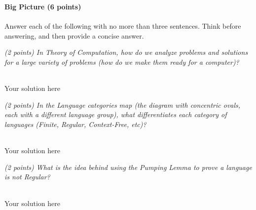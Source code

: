 \documentclass[12pt]{article}
\newenvironment{question}[2][Question]{\begin{trivlist}
\item[\hskip \labelsep {\bfseries #1}\hskip \labelsep {\bfseries #2.}]}{\end{trivlist}}
\newenvironment{solution}[1][Solution:]{\begin{trivlist}
\item[\hskip \labelsep {\bfseries #1}\hskip \labelsep {\bfseries}]\color{blue}}{\end{trivlist}}
\begin{document}
\clearpage
\begin{question}{1}\textbf{Big Picture  (6 points)}\\\\

Answer each of the following with no more than three sentences. Think before answering, and then provide a concise answer.


\begin{enumerate}[(a)]
	\item \textit{(2 points) In Theory of Computation, how do we analyze problems and solutions for a large variety of problems (how do we make them ready for a computer)?}

    \begin{solution}
  \;\\
  Your solution here
    \end{solution}


	\item \textit{(2 points) In the Language categories map (the diagram with concentric ovals, each with a different language group), what differentiates each category of languages (Finite, Regular, Context-Free, etc)?}

    \begin{solution}
         \;\\
  Your solution here
    \end{solution}


        \item \textit{(2 points) What is the idea behind using the Pumping Lemma to prove a language is not Regular?}

    \begin{solution}
         \;\\
  Your solution here
    \end{solution}

\end{enumerate}

\end{question}
\end{document}
